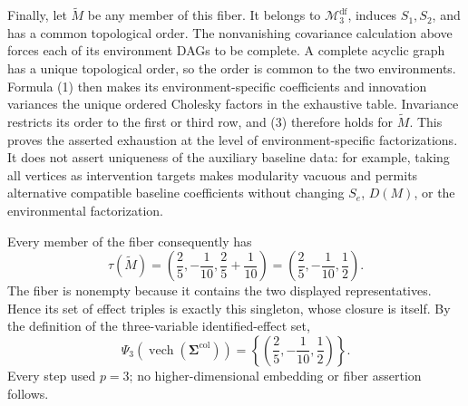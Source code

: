 Finally, let \(\widetilde M\) be any member of this fiber. It belongs to \(\mathcal M_3^{\mathrm{df}}\), induces \(S_1,S_2\), and has a common topological order. The nonvanishing covariance calculation above forces each of its environment DAGs to be complete. A complete acyclic graph has a unique topological order, so the order is common to the two environments. Formula (1) then makes its environment-specific coefficients and innovation variances the unique ordered Cholesky factors in the exhaustive table. Invariance restricts its order to the first or third row, and (3) therefore holds for \(\widetilde M\). This proves the asserted exhaustion at the level of environment-specific factorizations. It does not assert uniqueness of the auxiliary baseline data: for example, taking all vertices as intervention targets makes modularity vacuous and permits alternative compatible baseline coefficients without changing \(S_e\), \(D(M)\), or the environmental factorization.

Every member of the fiber consequently has
\[
 \tau(\widetilde M)
 =\left(\frac25,-\frac1{10},\frac25+\frac1{10}\right)
 =\left(\frac25,-\frac1{10},\frac12\right).
\]
The fiber is nonempty because it contains the two displayed representatives. Hence its set of effect triples is exactly this singleton, whose closure is itself. By the definition of the three-variable identified-effect set,
\[
 \Psi_3(\operatorname{vech}(\boldsymbol\Sigma^{\mathrm{col}}))
 =\left\{\left(\frac25,-\frac1{10},\frac12\right)\right\}.
\]
Every step used \(p=3\); no higher-dimensional embedding or fiber assertion follows.